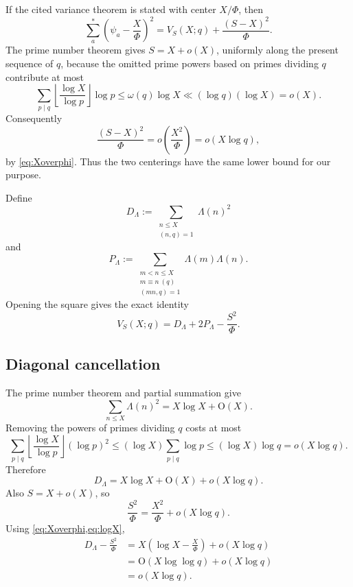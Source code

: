 \documentclass[11pt]{article}
\theoremstyle{definition}
\theoremstyle{remark}
\newcommand{\1}{\mathbf 1}
\newcommand{\OO}{\mathrm O}
\newcommand{\om}{\omega}
\begin{document}
If the cited variance theorem is stated with center $X/\Phi$, then
\begin{equation}\label{eq:center-transfer}
 \sum_a^*\left(\psi_a-\frac X\Phi\right)^2
 =V_S(X;q)+\frac{(S-X)^2}{\Phi}.
\end{equation}
The prime number theorem gives $S=X+o(X)$, uniformly along the present sequence of $q$, because the omitted prime powers based on primes dividing $q$ contribute at most
\[
 \sum_{p\mid q}\left\lfloor\frac{\log X}{\log p}\right\rfloor\log p
 \le \om(q)\log X\ll(\log q)(\log X)=o(X).
\]
Consequently
\[
 \frac{(S-X)^2}{\Phi}=o\!\left(\frac{X^2}{\Phi}\right)
 =o(X\log q),
\]
by \cref{eq:Xoverphi}.  Thus the two centerings have the same lower bound for our purpose.

Define
\[
 D_\Lambda:=\sum_{\substack{n\le X\\(n,q)=1}}\Lambda(n)^2
\]
and
\[
 P_\Lambda:=
 \sum_{\substack{m<n\le X\\m\equiv n\ (q)\\(mn,q)=1}}
 \Lambda(m)\Lambda(n).
\]
Opening the square gives the exact identity
\begin{equation}\label{eq:variance-expand}
 V_S(X;q)=D_\Lambda+2P_\Lambda-\frac{S^2}{\Phi}.
\end{equation}

\subsection{Diagonal cancellation}

The prime number theorem and partial summation give
\begin{equation}\label{eq:D-asymp}
 \sum_{n\le X}\Lambda(n)^2=X\log X+\OO(X).
\end{equation}
Removing the powers of primes dividing $q$ costs at most
\[
 \sum_{p\mid q}
 \left\lfloor\frac{\log X}{\log p}\right\rfloor(\log p)^2
 \le (\log X)\sum_{p\mid q}\log p
 \le(\log X)\log q=o(X\log q).
\]
Therefore
\begin{equation}\label{eq:D-coprime}
 D_\Lambda=X\log X+\OO(X)+o(X\log q).
\end{equation}
Also $S=X+o(X)$, so
\[
 \frac{S^2}{\Phi}=\frac{X^2}{\Phi}+o(X\log q).
\]
Using \cref{eq:Xoverphi,eq:logX},
\begin{align}
 D_\Lambda-\frac{S^2}{\Phi}
 &=X\left(\log X-\frac X\Phi\right)+o(X\log q)\\
 &=\OO(X\log\log q)+o(X\log q)\\
 &=o(X\log q).\label{eq:diag-cancel}
\end{align}
\end{document}
